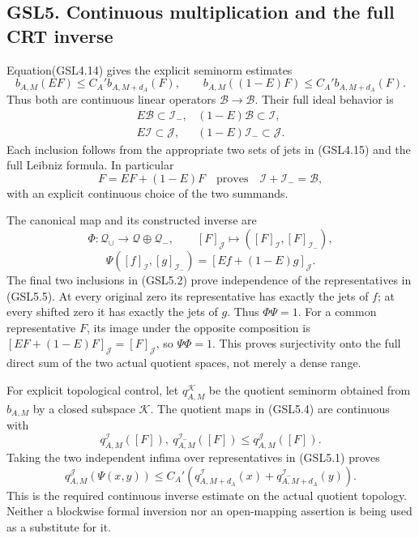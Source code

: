 \subsection{GSL5. Continuous multiplication and the full CRT
inverse}\label{gsl5.-continuous-multiplication-and-the-full-crt-inverse}

Equation(GSL4.14) gives the explicit seminorm estimates \[
b_{A,M}(EF)\le C_A'b_{A,M+d_A}(F),\qquad
b_{A,M}((1-E)F)\le C_A'b_{A,M+d_A}(F).
\tag{GSL5.1}
\] Thus both are continuous linear operators
\(\mathcal B\to\mathcal B\). Their full ideal behavior is \[
\begin{array}{lll}
E\mathcal B\subset\mathcal I_-, & (1-E)\mathcal B\subset\mathcal I,\\
E\mathcal I\subset\mathcal J, & (1-E)\mathcal I_-\subset\mathcal J.
\end{array}
\tag{GSL5.2}
\] Each inclusion follows from the appropriate two sets of jets in
(GSL4.15) and the full Leibniz formula. In particular \[
F=EF+(1-E)F\quad\text{proves}\quad
\mathcal I+\mathcal I_-=\mathcal B,
\tag{GSL5.3}
\] with an explicit continuous choice of the two summands.

The canonical map and its constructed inverse are \[
\Phi:\mathcal Q_{\cup}\longrightarrow\mathcal Q\oplus\mathcal Q_-,
\qquad [F]_{\mathcal J}\longmapsto([F]_{\mathcal I},[F]_{\mathcal I_-}),
\tag{GSL5.4}
\] \[
\Psi([f]_{\mathcal I},[g]_{\mathcal I_-})
 =[Ef+(1-E)g]_{\mathcal J}.
\tag{GSL5.5}
\] The final two inclusions in (GSL5.2) prove independence of the
representatives in (GSL5.5). At every original zero its representative
has exactly the jets of \(f\); at every shifted zero it has exactly the
jets of \(g\). Thus \(\Phi\Psi=1\). For a common representative \(F\),
its image under the opposite composition is
\([EF+(1-E)F]_{\mathcal J}=[F]_{\mathcal J}\), so \(\Psi\Phi=1\). This
proves surjectivity onto the full direct sum of the two actual quotient
spaces, not merely a dense range.

For explicit topological control, let \(q_{A,M}^{\mathcal K}\) be the
quotient seminorm obtained from \(b_{A,M}\) by a closed subspace
\(\mathcal K\). The quotient maps in (GSL5.4) are continuous with \[
q_{A,M}^{\mathcal I}([F]),\ q_{A,M}^{\mathcal I_-}([F])
 \le q_{A,M}^{\mathcal J}([F]).
\tag{GSL5.6}
\] Taking the two independent infima over representatives in (GSL5.1)
proves \[
q_{A,M}^{\mathcal J}(\Psi(x,y))
 \le C_A'\left(q_{A,M+d_A}^{\mathcal I}(x)
                  +q_{A,M+d_A}^{\mathcal I_-}(y)\right).
\tag{GSL5.7}
\] This is the required continuous inverse estimate on the actual
quotient topology. Neither a blockwise formal inversion nor an
open-mapping assertion is being used as a substitute for it.

